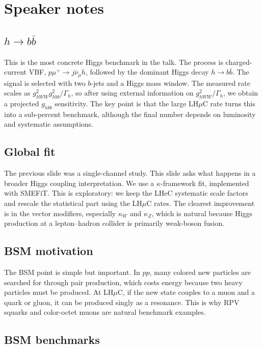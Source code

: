 \documentclass[11pt,a4paper]{article}
\newcommand{\LHmuC}{LH\ensuremath{\mu}C}
\begin{document}
\section{Speaker notes}

\subsection{\(h\to b\bar b\)}

This is the most concrete Higgs benchmark in the talk.  The process is charged-current
VBF, \(p\mu^+\to j\bar\nu_\mu h\), followed by the dominant Higgs decay \(h\to b\bar b\).
The signal is selected with two \(b\)-jets and a Higgs mass window.  The measured rate scales as
\(g_{hWW}^2g_{hbb}^2/\Gamma_h\), so after using external information on
\(g_{hWW}^2/\Gamma_h\), we obtain a projected \(g_{hbb}\) sensitivity.  The key point is that
the large \LHmuC{} rate turns this into a sub-percent benchmark, although the final number
depends on luminosity and systematic assumptions.

\subsection{Global fit}

The previous slide was a single-channel study.  This slide asks what happens in a broader Higgs
coupling interpretation.  We use a \(\kappa\)-framework fit, implemented with SMEFiT.  This is
exploratory: we keep the LHeC systematic scale factors and rescale the statistical part using the
\LHmuC{} rates.  The clearest improvement is in the vector modifiers, especially \(\kappa_W\) and
\(\kappa_Z\), which is natural because Higgs production at a lepton--hadron collider is primarily
weak-boson fusion.

\subsection{BSM motivation}

The BSM point is simple but important.  In \(pp\), many colored new particles are searched for
through pair production, which costs energy because two heavy particles must be produced.  At
\LHmuC{}, if the new state couples to a muon and a quark or gluon, it can be produced singly as
a resonance.  This is why RPV squarks and color-octet muons are natural benchmark examples.

\subsection{BSM benchmarks}
\end{document}
